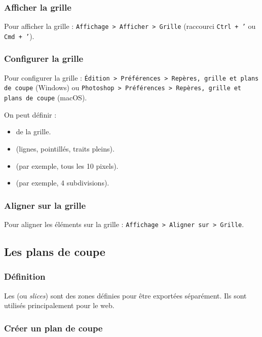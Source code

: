 \subsubsection{Afficher la grille}

Pour afficher la grille : \texttt{Affichage > Afficher > Grille} (raccourci \texttt{Ctrl + '} ou \texttt{Cmd + '}).

\subsubsection{Configurer la grille}

Pour configurer la grille : \texttt{Édition > Préférences > Repères, grille et plans de coupe} (Windows) ou \texttt{Photoshop > Préférences > Repères, grille et plans de coupe} (macOS).

On peut définir :

\begin{itemize}
    \item {} de la grille.
    \item {} (lignes, pointillés, traits pleins).
    \item {} (par exemple, tous les 10 pixels).
    \item {} (par exemple, 4 subdivisions).
\end{itemize}

\subsubsection{Aligner sur la grille}

Pour aligner les éléments sur la grille : \texttt{Affichage > Aligner sur > Grille}.

\subsection{Les plans de coupe}

\subsubsection{Définition}

Les  (ou \emph{slices}) sont des zones définies pour être exportées séparément. Ils sont utilisés principalement pour le web.

\subsubsection{Créer un plan de coupe}

